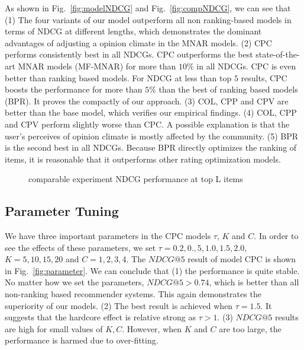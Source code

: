 \documentclass[sigconf]{acmart}
\begin{document}
As shown in Fig.~\ref{fig:modelNDCG} and Fig.~\ref{fig:compNDCG}, we can see that (1) The four variants of our model outperform all non ranking-based models in terms of NDCG at different lengths, which demonstrates the dominant advantages of adjusting a opinion climate in the MNAR models.  (2) CPC performs consistently best in all NDCGs. CPC outperforms the best state-of-the-art MNAR  models (MF-MNAR) for more than $10\%$ in all NDCGs. CPC is even better than ranking based models. For NDCG at less than top $5$ results, CPC boosts the performance for more than $5\%$ than the best of ranking based models (BPR). It proves the compactly of our approach. (3) COL, CPP and CPV are better than the base model, which verifies our empirical findings. (4) COL, CPP and CPV perform slightly worse than CPC. A possible explanation is that the user's perceives of opinion climate is mostly affected by the community. (5) BPR is the second best in all NDCGs. Because BPR directly optimizes the ranking of items, it is reasonable that it outperforms other rating optimization models.  


\begin{figure}[!htbp]
\centering
{}
\vspace{-1em}
\hspace{-1em}
\caption{comparable experiment NDCG performance at top L items}
\end{figure}


\subsection{Parameter Tuning}
We have three important parameters in the CPC models $\tau$, $K$ and $C$. In order to see the effects of these parameters, we set $\tau=0.2,0.,5,1.0,1.5,2.0$, $K=5,10,15,20$ and $C=1,2,3,4$. The $NDCG@5$ result of model CPC is shown in Fig.~\ref{fig:parameter}. We can conclude that (1) the performance is quite stable. No matter how we set the parameters,  $NDCG@5>0.74$, which is better than all non-ranking based recommender systems. This again demonstrates the superiority of our models.
(2) The best result is achieved when $\tau=1.5$. It suggests that the hardcore effect is relative strong as $\tau>1$.  (3) $NDCG@5$ results are high for small values of $K,C$. However, when $K$ and $C$ are too large, the performance is harmed due to over-fitting.
\end{document}
